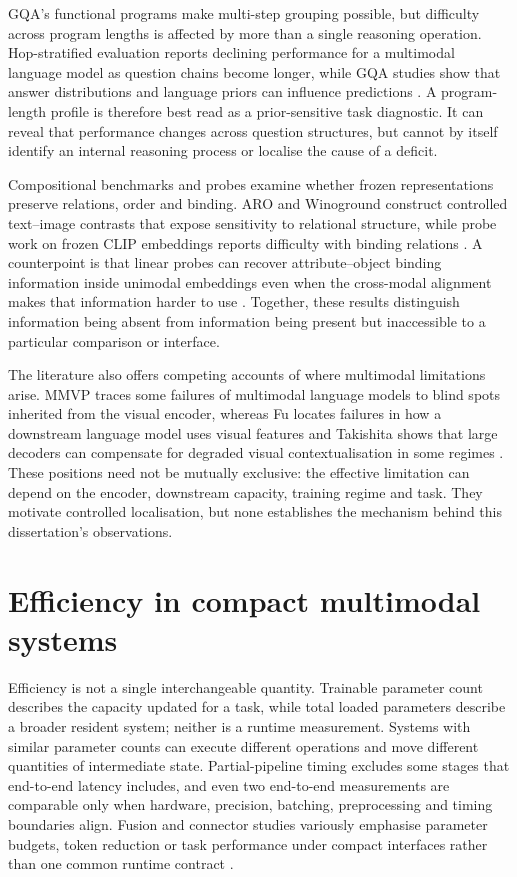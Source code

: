 GQA's functional programs make multi-step grouping possible, but difficulty across program lengths is affected by more than a single reasoning operation. Hop-stratified evaluation reports declining performance for a multimodal language model as question chains become longer, while GQA studies show that answer distributions and language priors can influence predictions \citep{kil2024iimmr,kervadec2021gqaood,kervadec2021reasoning}. A program-length profile is therefore best read as a prior-sensitive task diagnostic. It can reveal that performance changes across question structures, but cannot by itself identify an internal reasoning process or localise the cause of a deficit.

Compositional benchmarks and probes examine whether frozen representations preserve relations, order and binding. ARO and Winoground construct controlled text--image contrasts that expose sensitivity to relational structure, while probe work on frozen CLIP embeddings reports difficulty with binding relations \citep{yuksekgonul2023aro,thrush2022winoground,lewis2024bind}. A counterpoint is that linear probes can recover attribute--object binding information inside unimodal embeddings even when the cross-modal alignment makes that information harder to use \citep{koishigarina2026bow}. Together, these results distinguish information being absent from information being present but inaccessible to a particular comparison or interface.

The literature also offers competing accounts of where multimodal limitations arise. MMVP traces some failures of multimodal language models to blind spots inherited from the visual encoder, whereas Fu locates failures in how a downstream language model uses visual features and Takishita shows that large decoders can compensate for degraded visual contextualisation in some regimes \citep{tong2024mmvp,fu2025hidden,takishita2025compensate}. These positions need not be mutually exclusive: the effective limitation can depend on the encoder, downstream capacity, training regime and task. They motivate controlled localisation, but none establishes the mechanism behind this dissertation's observations.

\section{Efficiency in compact multimodal systems}
\label{sec:ch2-efficiency}

Efficiency is not a single interchangeable quantity. Trainable parameter count describes the capacity updated for a task, while total loaded parameters describe a broader resident system; neither is a runtime measurement. Systems with similar parameter counts can execute different operations and move different quantities of intermediate state. Partial-pipeline timing excludes some stages that end-to-end latency includes, and even two end-to-end measurements are comparable only when hardware, precision, batching, preprocessing and timing boundaries align. Fusion and connector studies variously emphasise parameter budgets, token reduction or task performance under compact interfaces rather than one common runtime contract \citep{benyounes2017mutan,vallaeys2024depalm,hu2024mqt}.

